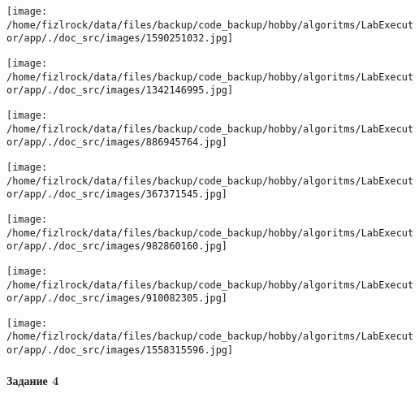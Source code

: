\documentclass[a4paper, 12pt]{article}
\begin{document}
\texttt{[image: /home/fizlrock/data/files/backup/code\_backup/hobby/algoritms/LabExecutor/app/./doc\_src/images/1590251032.jpg]}

\texttt{[image: /home/fizlrock/data/files/backup/code\_backup/hobby/algoritms/LabExecutor/app/./doc\_src/images/1342146995.jpg]}

\texttt{[image: /home/fizlrock/data/files/backup/code\_backup/hobby/algoritms/LabExecutor/app/./doc\_src/images/886945764.jpg]}

\texttt{[image: /home/fizlrock/data/files/backup/code\_backup/hobby/algoritms/LabExecutor/app/./doc\_src/images/367371545.jpg]}

\texttt{[image: /home/fizlrock/data/files/backup/code\_backup/hobby/algoritms/LabExecutor/app/./doc\_src/images/982860160.jpg]}

\texttt{[image: /home/fizlrock/data/files/backup/code\_backup/hobby/algoritms/LabExecutor/app/./doc\_src/images/910082305.jpg]}

\texttt{[image: /home/fizlrock/data/files/backup/code\_backup/hobby/algoritms/LabExecutor/app/./doc\_src/images/1558315596.jpg]}
\pagebreak
\paragraph{Задание 4}
\end{document}
